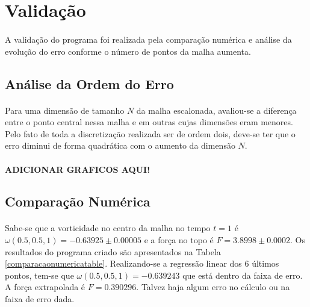 \documentclass[validacao.tex]{subfiles}
\begin{document}
\section{Validação}
\paragraph{} A validação do programa foi realizada pela comparação numérica e análise da evolução do erro conforme o número de pontos da malha aumenta.

\subsection{Análise da Ordem do Erro}
\paragraph{} Para uma dimensão de tamanho $N$ da malha escalonada, avaliou-se a diferença entre o ponto central nessa malha e em outras cujas dimensões eram menores. Pelo fato de toda a discretização realizada ser de ordem dois, deve-se ter que o erro diminui de forma quadrática com o aumento da dimensão $N$.

\paragraph{ADICIONAR GRAFICOS AQUI!}

\subsection{Comparação Numérica}

\paragraph{} Sabe-se que a vorticidade no centro da malha no tempo $t=1$ é $\omega(0.5, 0.5, 1) = -0.63925\pm 0.00005$ e a força no topo é $F = 3.8998\pm 0.0002$.  Os resultados do programa criado são apresentados na Tabela \ref{comparacaonumericatable}. Realizando-se a regressão linear dos 6 últimos pontos, tem-se que $\omega(0.5, 0.5, 1) = -0.639243$ que está dentro da faixa de erro. A força extrapolada é $F = 0.390296$. Talvez haja algum erro no cálculo ou na faixa de erro dada.
\end{document}
